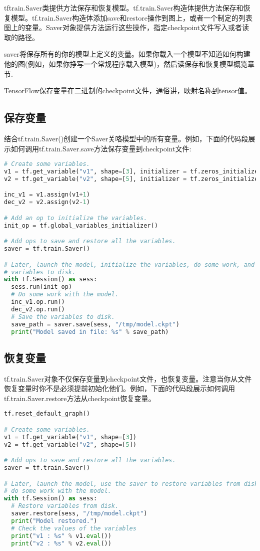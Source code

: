 tftrain.Saver类提供方法保存和恢复模型。tf.train.Saver构造体提供方法保存和恢复模型。tf.train.Saver构造体添加save和restore操作到图上，或者一个制定的列表图上的变量。Saver对象提供方法运行这些操作，指定checkpoint文件写入或者读取的路径。

saver将保存所有的你的模型上定义的变量。如果你载入一个模型不知道如何构建他的图(例如，如果你挣写一个常规程序载入模型)，然后读保存和恢复模型概览章节.

TensorFlow保存变量在二进制的checkpoint文件，通俗讲，映射名称到tensor值。
\subsection{保存变量}
结合tf.train.Saver()创建一个Saver关咯模型中的所有变量。例如，下面的代码段展示如何调用tf.train.Saver.save方法保存变量到checkpoint文件:
\begin{lstlisting}[language=Python]
# Create some variables.
v1 = tf.get_variable("v1", shape=[3], initializer = tf.zeros_initializer)
v2 = tf.get_variable("v2", shape=[5], initializer = tf.zeros_initializer)

inc_v1 = v1.assign(v1+1)
dec_v2 = v2.assign(v2-1)

# Add an op to initialize the variables.
init_op = tf.global_variables_initializer()

# Add ops to save and restore all the variables.
saver = tf.train.Saver()

# Later, launch the model, initialize the variables, do some work, and save the
# variables to disk.
with tf.Session() as sess:
  sess.run(init_op)
  # Do some work with the model.
  inc_v1.op.run()
  dec_v2.op.run()
  # Save the variables to disk.
  save_path = saver.save(sess, "/tmp/model.ckpt")
  print("Model saved in file: %s" % save_path)
\end{lstlisting}
\subsection{恢复变量}
tf.train.Saver对象不仅保存变量到checkpoint文件，也恢复变量。注意当你从文件恢复变量时你不是必须提前初始化他们。例如，下面的代码段展示如何调用tf.train.Saver.restore方法从checkpoint恢复变量。
\begin{lstlisting}[language=Python]
tf.reset_default_graph()

# Create some variables.
v1 = tf.get_variable("v1", shape=[3])
v2 = tf.get_variable("v2", shape=[5])

# Add ops to save and restore all the variables.
saver = tf.train.Saver()

# Later, launch the model, use the saver to restore variables from disk, and
# do some work with the model.
with tf.Session() as sess:
  # Restore variables from disk.
  saver.restore(sess, "/tmp/model.ckpt")
  print("Model restored.")
  # Check the values of the variables
  print("v1 : %s" % v1.eval())
  print("v2 : %s" % v2.eval())
\end{lstlisting}
